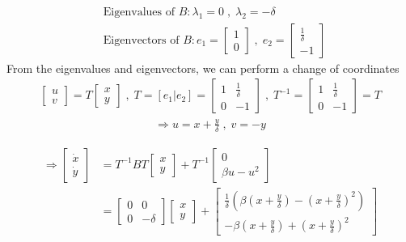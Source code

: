 \begin{solution}[4.3]
\begin{enumerate}
\begin{align}
	& \text{Eigenvalues of } B: \lambda_1 = 0 \; , \; \lambda_2 = -\delta \\
	& \text{Eigenvectors of } B: e_1 = \begin{bmatrix}
		1 \\ 0
	\end{bmatrix} \; , \; e_2 = \begin{bmatrix}
		\frac{1}{\delta} \\ -1
	\end{bmatrix}
\end{align}
From the eigenvalues and eigenvectors, we can perform a change of coordinates
\begin{align}
	\begin{bmatrix}
		u \\ v
	\end{bmatrix} = T \begin{bmatrix}
		x \\ y
	\end{bmatrix} \; , \; T = [e_1 \vert e_2] = \begin{bmatrix}
		1 & \frac{1}{\delta} \\ 0 & -1
	\end{bmatrix} \; , \; T^{-1} = \begin{bmatrix}
		1 & \frac{1}{\delta} \\ 0 & -1
	\end{bmatrix} = T
\end{align}
\begin{align}
	\Longrightarrow u = x + \frac{y}{\delta} \; , \; v = -y
\end{align}

\begin{align}
	\Longrightarrow \begin{bmatrix}
		\dot{x} \\ \dot{y}
	\end{bmatrix} &= T^{-1}BT \begin{bmatrix}
		x \\ y
	\end{bmatrix} + T^{-1} \begin{bmatrix}
		0 \\ \beta u - u^2
	\end{bmatrix} \nonumber \\
	\label{S04E021}
	&= \begin{bmatrix}
		0  & 0 \\ 0 & -\delta
	\end{bmatrix} \begin{bmatrix}
		x \\ y
	\end{bmatrix} + \begin{bmatrix}
		\frac{1}{\delta} \left( \beta \left( x + \frac{y}{\delta} \right) - \left( x + \frac{y}{\delta} \right)^2 \right) \\
		-\beta \left( x + \frac{y}{\delta} \right) + \left( x + \frac{y}{\delta} \right)^2
	\end{bmatrix} 
\end{align}


\end{enumerate}
\end{solution}
